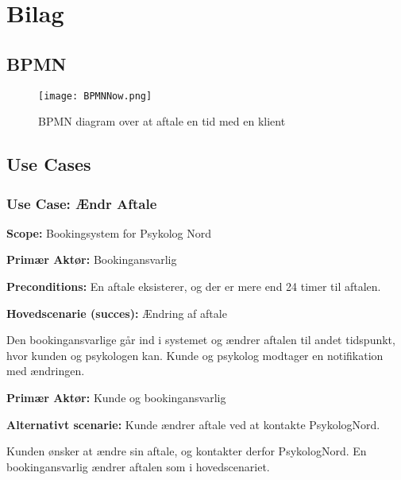\section{Bilag}

\subsection{BPMN}

\begin{figure}[h]
    \caption{BPMN diagram over at aftale en tid med en klient}
    \centering
        \texttt{[image: BPMNNow.png]}
        \label{bilag:bpmnnow}
\end{figure}

\subsection{Use Cases}
\label{bilag:UseCases}
\subsubsection*{Use Case: Ændr Aftale}
{\setlength{\parindent}{0cm}
\textbf{Scope:} Bookingsystem for Psykolog Nord

\textbf{Primær Aktør:} Bookingansvarlig 

\textbf{Preconditions:} En aftale eksisterer, og der er mere end 24 timer til aftalen.

\textbf{Hovedscenarie (succes):} Ændring af aftale

Den bookingansvarlige går ind i systemet og ændrer aftalen til andet tidspunkt, hvor kunden og psykologen kan.
Kunde og psykolog modtager en notifikation med ændringen.

\textbf{Primær Aktør:} Kunde og bookingansvarlig

\textbf{Alternativt scenarie:} Kunde ændrer aftale ved at kontakte PsykologNord.

Kunden ønsker at ændre sin aftale, og kontakter derfor PsykologNord.
En bookingansvarlig ændrer aftalen som i hovedscenariet.
}


